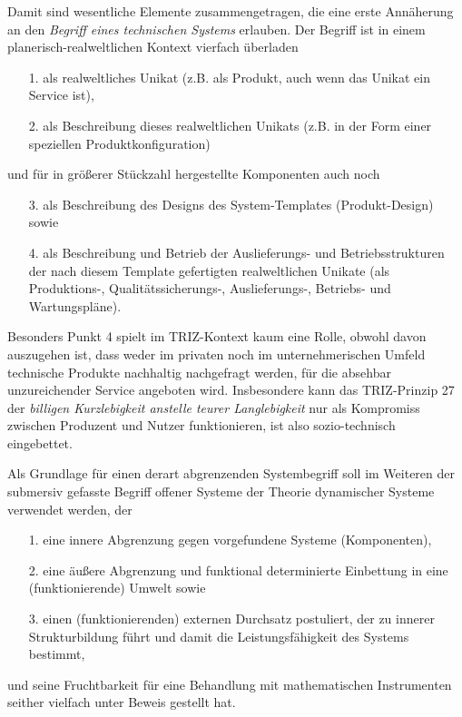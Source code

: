 \documentclass[11pt,a4paper]{article}
\begin{document}
Damit sind wesentliche Elemente zusammengetragen, die eine erste Annäherung an
den \emph{Begriff eines technischen Systems} erlauben.  Der Begriff ist in
einem planerisch-realweltlichen Kontext vierfach überladen
\begin{itemize}
\item [1.] als realweltliches Unikat (z.B. als Produkt, auch wenn das Unikat
  ein Service ist),
\item [2.] als Beschreibung dieses realweltlichen Unikats (z.B. in der Form
  einer speziellen Produktkonfiguration)
\end{itemize}
und für in größerer Stückzahl hergestellte Komponenten auch noch
\begin{itemize}
\item [3.] als Beschreibung des Designs des System-Templates (Produkt-Design)
  sowie
\item [4.] als Beschreibung und Betrieb der Auslieferungs- und
  Betriebsstrukturen der nach diesem Template gefertigten realweltlichen
  Unikate (als Produktions-, Qualitätssicherungs-, Auslieferungs-, Betriebs-
  und Wartungspläne).
\end{itemize}
Besonders Punkt 4 spielt im TRIZ-Kontext kaum eine Rolle, obwohl davon
auszugehen ist, dass weder im privaten noch im unternehmerischen Umfeld
technische Produkte nachhaltig nachgefragt werden, für die absehbar
unzureichender Service angeboten wird. Insbesondere kann das TRIZ-Prinzip 27
der \emph{billigen Kurzlebigkeit anstelle teurer Langlebigkeit} nur als
Kompromiss zwischen Produzent und Nutzer funktionieren, ist also
sozio-technisch eingebettet.

Als Grundlage für einen derart abgrenzenden Systembegriff soll im Weiteren der
submersiv gefasste Begriff offener Systeme der Theorie dynamischer Systeme
\cite{Bertalanffy1950} verwendet werden, der
\begin{itemize}
\item [1.] eine innere Abgrenzung gegen vorgefundene Systeme (Komponenten), 
\item [2.] eine äußere Abgrenzung und funktional determinierte Einbettung in
  eine (funktionierende) Umwelt sowie
\item [3.] einen (funktionierenden) externen Durchsatz postuliert, der zu
  innerer Strukturbildung führt und damit die Leistungsfähigkeit des Systems
  bestimmt,
\end{itemize}
und seine Fruchtbarkeit für eine Behandlung mit mathematischen Instrumenten
seither vielfach unter Beweis gestellt hat.  
\end{document}
